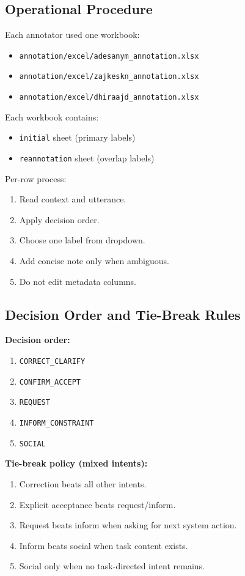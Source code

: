 \documentclass[11pt]{article}
\begin{document}
\subsection{Operational Procedure}
Each annotator used one workbook:
\begin{itemize}
  \item \texttt{annotation/excel/adesanym\_annotation.xlsx}
  \item \texttt{annotation/excel/zajkeskn\_annotation.xlsx}
  \item \texttt{annotation/excel/dhiraajd\_annotation.xlsx}
\end{itemize}

Each workbook contains:
\begin{itemize}
  \item \texttt{initial} sheet (primary labels)
  \item \texttt{reannotation} sheet (overlap labels)
\end{itemize}

Per-row process:
\begin{enumerate}
  \item Read context and utterance.
  \item Apply decision order.
  \item Choose one label from dropdown.
  \item Add concise note only when ambiguous.
  \item Do not edit metadata columns.
\end{enumerate}

\subsection{Decision Order and Tie-Break Rules}
\textbf{Decision order:}
\begin{enumerate}
  \item \texttt{CORRECT\_CLARIFY}
  \item \texttt{CONFIRM\_ACCEPT}
  \item \texttt{REQUEST}
  \item \texttt{INFORM\_CONSTRAINT}
  \item \texttt{SOCIAL}
\end{enumerate}

\textbf{Tie-break policy (mixed intents):}
\begin{enumerate}
  \item Correction beats all other intents.
  \item Explicit acceptance beats request/inform.
  \item Request beats inform when asking for next system action.
  \item Inform beats social when task content exists.
  \item Social only when no task-directed intent remains.
\end{enumerate}
\end{document}
